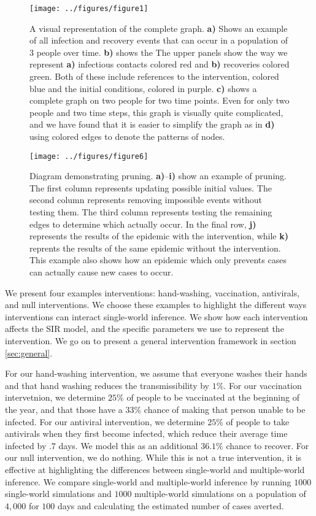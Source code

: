 \documentclass[openacc]{rsproca_new}%
\begin{document}
\begin{figure}\label{fig:network-example}
\texttt{[image: ../figures/figure1]} %
\caption{A visual representation of the complete graph.  \textbf{a)} Shows an example of all infection and recovery events that can occur in a population of $3$ people over time.  \textbf{b)} shows the The upper panels show the way we represent \textbf{a)} infectious contacts colored red and \textbf{b)} recoveries colored green.  Both of these include references to the intervention, colored blue and the initial conditions, colored in purple.  \textbf{c)} shows a complete graph on two people for two time points.  Even for only two people and two time steps, this graph is visually quite complicated, and we have found that it is easier to simplify the graph as in \textbf{d)} using colored edges to denote the patterns of nodes.}
\end{figure}

\begin{figure}
\texttt{[image: ../figures/figure6]} %
\caption{Diagram demonstrating pruning. \textbf{a)}--\textbf{i)} show an example of pruning.  The first column represents updating possible initial values.  The second column represents removing impossible events without testing them.  The third column represents testing the remaining edges to determine which actually occur.  In the final row, \textbf{j)} represents the results of the epidemic with the intervention, while \textbf{k)} reprents the results of the same epidemic without the intervention.  This example also shows how an epidemic which only prevents cases can actually cause new cases to occur.}
\end{figure}

We present four examples interventions: hand-washing, vaccination, antivirals, and null interventions.
We choose these examples to highlight the different ways interventions can interact single-world inference.
We show how each intervention affects the SIR model, and the specific parameters we use to represent the intervention.
We go on to present a general intervention framework in section \ref{sec:general}.

For our hand-washing intervention, we assume that everyone washes their hands and that hand washing reduces the transmissibility by $1\%$.
For our vaccination intervetnion, we determine $25\%$ of people to be vaccinated at the beginning of the year, and that those have a $33\%$ chance of making that person unable to be infected.
For our antiviral intervention, we determine $25\%$ of people to take antivirals when they first become infected, which reduce their average time infected by $.7$ days.
We model this as an additional $36.1\%$ chance to recover.
For our null intervention, we do nothing.
While this is not a true intervention, it is effective at highlighting the differences between single-world and multiple-world inference.
We compare single-world and multiple-world inference by running $1000$ single-world simulations and $1000$ multiple-world simulations on a population of $4,000$ for $100$ days and calculating the estimated number of cases averted.
\end{document}
